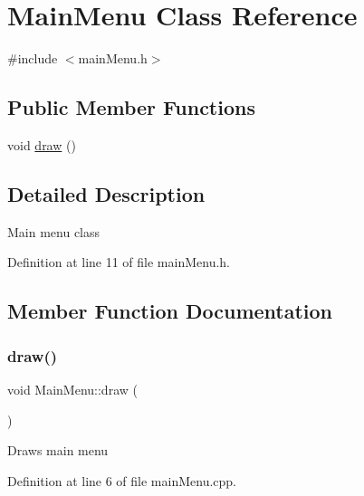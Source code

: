 \hypertarget{class_main_menu}{}\section{Main\+Menu Class Reference}
\label{class_main_menu}


{\ttfamily \#include $<$main\+Menu.\+h$>$}

\subsection*{Public Member Functions}
\begin{DoxyCompactItemize}
\item 
void \mbox{\hyperlink{class_main_menu_a6c17addf154519404a791d3c2a40a2aa}{draw}} ()
\end{DoxyCompactItemize}


\subsection{Detailed Description}
Main menu class 

Definition at line 11 of file main\+Menu.\+h.



\subsection{Member Function Documentation}
\mbox{\label{class_main_menu_a6c17addf154519404a791d3c2a40a2aa}} 
\subsubsection{\texorpdfstring{draw()}{draw()}}
{\footnotesize\ttfamily void Main\+Menu\+::draw (\begin{DoxyParamCaption}{ }\end{DoxyParamCaption})}

Draws main menu 

Definition at line 6 of file main\+Menu.\+cpp.


